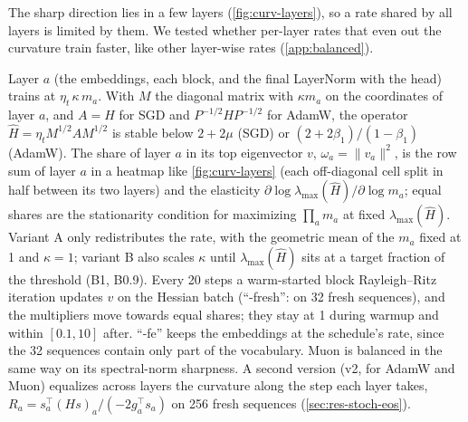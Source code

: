 \documentclass[10pt]{article}
\makeatletter
\renewcommand\paragraph{\@startsection{paragraph}{4}{\z@}{1.2ex \@plus .4ex \@minus .2ex}{-1em}{\normalfont\normalsize\bfseries}}
\newcommand{\lmax}{\lambda_{\max}}
\makeatother
\begin{document}
The sharp direction lies in a few layers (\cref{fig:curv-layers}), so a rate shared by all layers is limited by
them. We tested whether per-layer rates that even out the curvature train faster, like other layer-wise rates
\citep{you2017lars,yang2021mup,wang2025sharpness} (\cref{app:balanced}).

\paragraph{Method.} Layer $a$ (the embeddings, each block, and the final LayerNorm with the head) trains at
$\eta_t\,\kappa\,m_a$. With $M$ the diagonal matrix with $\kappa m_a$ on the coordinates of layer $a$, and $A=H$ for
SGD and $P^{-1/2}HP^{-1/2}$ for AdamW, the operator $\hat H=\eta_tM^{1/2}AM^{1/2}$ is stable below $2+2\mu$ (SGD) or
$(2+2\beta_1)/(1-\beta_1)$ (AdamW). The share of layer $a$ in its top eigenvector $v$, $\omega_a=\|v_a\|^2$, is the
row sum of layer $a$ in a heatmap like \cref{fig:curv-layers} (each off-diagonal cell split in half between its two
layers) and the elasticity $\partial\log\lmax(\hat H)/\partial\log m_a$; equal shares are the stationarity
condition for maximizing $\prod_am_a$ at fixed $\lmax(\hat H)$. Variant A only redistributes the rate, with the
geometric mean of the $m_a$ fixed at 1 and $\kappa=1$; variant B also scales $\kappa$ until $\lmax(\hat H)$ sits at a
target fraction of the threshold (B1, B0.9). Every 20 steps a warm-started block Rayleigh--Ritz iteration updates $v$
on the Hessian batch (``-fresh'': on 32 fresh sequences), and the multipliers move towards equal shares; they stay
at 1 during warmup and within $[0.1,10]$ after. ``-fe'' keeps the embeddings at the schedule's rate, since the 32
sequences contain only part of the vocabulary. Muon is balanced in the same way on its spectral-norm sharpness. A
second version (v2, for AdamW and Muon) equalizes across layers the curvature along the step each layer takes,
$R_a=s_a^\top(Hs)_a/(-2g_a^\top s_a)$ on 256 fresh sequences (\cref{sec:res-stoch-eos}).
\end{document}
